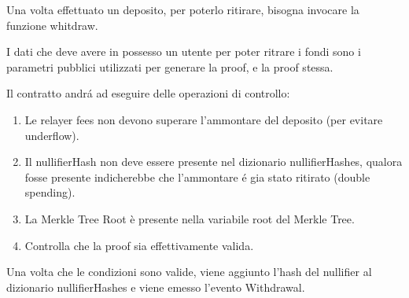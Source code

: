Una volta effettuato un deposito, per poterlo ritirare, bisogna invocare la funzione whitdraw.

I dati che deve avere in possesso un utente per poter ritrare i fondi sono i parametri pubblici utilizzati per generare la proof, e la proof stessa.

Il contratto andrá ad eseguire delle operazioni di controllo:

\begin{enumerate}
    \item Le relayer fees non devono superare l'ammontare del deposito (per evitare underflow).
    \item Il nullifierHash non deve essere presente nel dizionario nullifierHashes, qualora fosse presente indicherebbe che l'ammontare é gia stato ritirato (double spending).
    \item La Merkle Tree Root è presente nella variabile root del Merkle Tree.
    \item Controlla che la proof sia effettivamente valida.
\end{enumerate}

Una volta che le condizioni sono valide, viene aggiunto l'hash del nullifier al dizionario nullifierHashes e viene emesso l'evento Withdrawal.